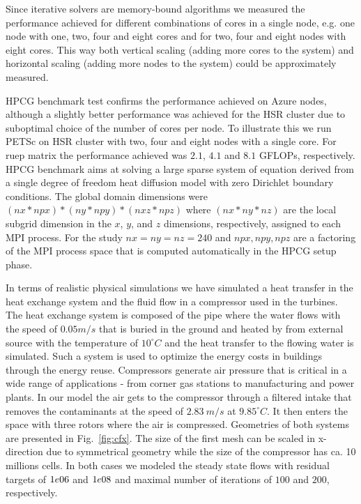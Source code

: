 \documentclass[3p,times]{elsarticle}
\begin{document}
Since iterative solvers are memory-bound algorithms we measured the performance achieved for different combinations of cores in a single node, e.g. one node with one, two, four and eight cores and for two, four and eight nodes with eight cores. This way both vertical scaling (adding more cores to the system) and horizontal scaling (adding more nodes to the system) could be approximately measured. %

HPCG benchmark test confirms the performance achieved on Azure nodes, although a slightly better performance was achieved for the HSR cluster due to suboptimal choice of the number of cores per node.  To illustrate this we run PETSc on HSR cluster with two, four and eight nodes with a single core. For ruep matrix the performance achieved was $2.1$, $4.1$ and $8.1$ GFLOPs, respectively. HPCG benchmark aims at solving a large sparse system of equation derived from a single degree of freedom heat diffusion model with zero Dirichlet boundary conditions. The global domain dimensions were $(nx * npx ) * (ny * npy ) * (nxz * npz )$ where $(nx * ny * nz )$ are the local subgrid dimension in the $x$, $y$, and $z$ dimensions, respectively, assigned to each MPI process. For the study $nx = ny = nz = 240$ and $npx, npy, npz$ are a factoring of the MPI process space that is computed automatically in the HPCG setup phase.

In terms of realistic physical simulations we have simulated a heat transfer in the heat exchange system and the fluid flow in a compressor used in the turbines. The heat exchange system is composed of the  pipe where the water flows with the speed of $0.05 m/s$ that is buried in the ground and heated by from external source with the temperature of $10 ^\circ C$ and the heat transfer to the flowing water is simulated. Such a system is used to optimize the energy costs in buildings through the energy reuse.  
Compressors generate air pressure that is critical in a wide range of applications - from corner gas stations to manufacturing and power plants. In our model the air gets to the compressor through a filtered intake that removes the contaminants at the speed of $2.83\ m/s$ at $9.85 ^\circ C$. It then enters the space with three rotors where the air is compressed. Geometries of both systems are presented in Fig.~\ref{fig:cfx}. The size of the first mesh can be scaled  in x-direction due to symmetrical geometry while the size of the compressor has ca. 10 millions cells. In both cases we modeled the steady state flows with residual targets of $1e\-06$ and $1e\-08$ and maximal number of iterations of $100$ and $200$, respectively.
\end{document}
